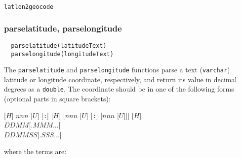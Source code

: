 \SEE

\verb`latlon2geocode`

\subsubsection{parselatitude, parselongitude}
\label{parselatitudeSqlFunc}

\begin{verbatim}
  parselatitude(latitudeText)
  parselongitude(longitudeText)
\end{verbatim}

The \verb`parselatitude` and \verb`parselongitude` functions parse a
text (\verb`varchar`) latitude or longitude coordinate, respectively,
and return its value in decimal degrees as a \verb`double`.  The
coordinate should be in one of the following forms (optional parts in
square brackets):

[$H$] $nnn$ [$U$] [\verb`:`] [$H$] [$nnn$ [$U$] [\verb`:`] [$nnn$ [$U$]]] [$H$] \\
$DDMM$[$.MMM$...] \\
$DDMMSS$[$.SSS$...]

where the terms are:


